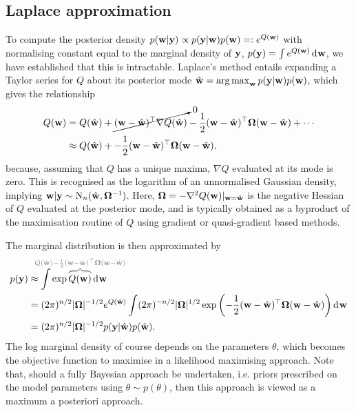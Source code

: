 \subsection{Laplace approximation}

To compute the posterior density $p({\mathbf w}|{\mathbf y}) \propto p({\mathbf y}|{\mathbf w})p({\mathbf w}) =: e^{Q({\mathbf w})}$ with normalising constant equal to the marginal density of ${\mathbf y}$, $p({\mathbf y}) = \int e^{Q({\mathbf w})} \operatorname{d}\hspace{0.5pt}\! {\mathbf w}$, we have established that this is intractable.
Laplace's method \citep[§4.1.1, pp. 777--778]{kass1995bayes} entails expanding a Taylor series for $Q$ about its posterior mode $\hat{{\mathbf w}} = \operatorname*{arg\,max}_{\mathbf w} p({\mathbf y}|{\mathbf w})p({\mathbf w})$, which gives the relationship
\begin{align*}
  Q({\mathbf w}) 
  &= Q(\hat{{\mathbf w}}) + 
  \cancelto{0}{({\mathbf w} - \hat{{\mathbf w}})^\top \nabla Q(\hat{{\mathbf w}})} 
  - \frac{1}{2} ({\mathbf w} - \hat{{\mathbf w}})^\top {\bm\Omega} ({\mathbf w} - \hat{{\mathbf w}}) + \cdots \\
  &\approx Q(\hat{{\mathbf w}}) + 
  - \frac{1}{2} ({\mathbf w} - \hat{{\mathbf w}})^\top {\bm\Omega} ({\mathbf w} - \hat{{\mathbf w}}),
\end{align*}
because, assuming that $Q$ has a unique maxima, $\nabla Q$ evaluated at its mode is zero.
This is recognised as the logarithm of an unnormalised Gaussian density, implying ${\mathbf w}|{\mathbf y} \sim \operatorname{N}_n(\hat{{\mathbf w}},{\bm\Omega}^{-1})$.
Here, ${\bm\Omega} = -\nabla^2 Q({\mathbf w})|_{{\mathbf w}=\hat{{\mathbf w}}}$ is the negative Hessian of $Q$ evaluated at the posterior mode, and is typically obtained as a byproduct of the maximisation routine of $Q$ using gradient or quasi-gradient based methods.

The marginal distribution is then approximated by
\begin{align*}
  p(\by) 
  &\approx \int \exp
  \greyoverbrace{Q(\bw)}{\hidewidth Q(\hat\bw) - \half (\bw - \hat\bw)^\top \bOmega (\bw - \hat\bw)\hidewidth}
   \dint \bw \\
  &= (2\pi)^{n/2} \abs{\bOmega}^{-1/2} e^{Q(\hat\bw)} 
  \int (2\pi)^{-n/2} \abs{\bOmega}^{1/2} \exp \left(- \half (\bw - \hat\bw)^\top \bOmega (\bw - \hat\bw) \right) \dint\bw \\
  &= (2\pi)^{n/2} \abs{\bOmega}^{-1/2} p(\by|\hat\bw)p(\hat\bw).
\end{align*} 
The log marginal density of course depends on the parameters $\theta$, which becomes the objective function to maximise in a likelihood maximising approach.
Note that, should a fully Bayesian approach be undertaken, i.e. priors prescribed on the model parameters using $\theta \sim p(\theta)$, then this approach is viewed as a maximum a posteriori approach.


